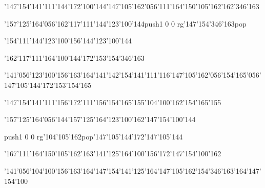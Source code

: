\null\vfill\ipa\centerline{\enskip\char'147\char'154\char'141\char'111\char'144\char'172\enskip\char'100\char'144\enskip\char'147\char'105\char'162\char'056\char'111\char'164\enskip\enskip\enskip\char'150\char'105\char'162\enskip\char'162\char'346\char'163}\medskip\centerline{\enskip\char'157\char'125\char'164\char'056\char'162\char'117\char'111\char'144\enskip\enskip\enskip\enskip\char'123\char'100\char'144\enskip\enskip\enskip\enskip\enskip\pdfcolorstack\match push{1 0 0 rg}\char'147\char'154\char'346\char'163\pdfcolorstack\match pop{}}\medskip\centerline{\enskip\char'154\char'111\char'144\enskip\enskip\enskip\enskip\char'123\char'100\char'156\char'144\enskip\enskip\enskip\char'123\char'100\char'144}\medskip\centerline{\enskip\enskip\enskip\enskip\enskip\enskip\enskip\enskip\enskip\enskip\enskip\enskip\char'162\char'117\char'111\char'164\enskip\char'100\char'144\char'172\enskip\char'153\char'154\char'346\char'163}\medskip\centerline{\enskip\char'141\char'056\char'123\char'100\char'156\char'163\char'164\enskip\char'141\enskip\char'142\char'154\char'141\char'111\char'116\enskip\char'147\char'105\char'162\char'056\char'154\char'165\char'056\char'147\char'105\char'144\char'172\enskip\char'153\char'154\char'165}\medskip\vfill\footline{\hfil\tt\folio\hfil}\eject
\null\vfill\ipa\centerline{\enskip\char'147\char'154\char'141\char'111\char'156\char'172\enskip\char'111\char'156\enskip\char'154\char'165\char'155\enskip\enskip\enskip\enskip\enskip\enskip\char'104\char'100\char'162\enskip\char'154\char'165\char'155}\medskip\centerline{\enskip\char'157\char'125\char'164\char'056\char'144\char'157\char'125\char'164\enskip\enskip\enskip\enskip\char'123\char'100\char'162\enskip\enskip\enskip\enskip\enskip\char'147\char'154\char'100\char'144}\medskip\centerline{\enskip\pdfcolorstack\match push{1 0 0 rg}\char'104\char'105\char'162\pdfcolorstack\match pop{}\enskip\enskip\enskip\enskip\char'147\char'105\char'144\char'172\enskip\enskip\enskip\char'147\char'105\char'144}\medskip\centerline{\enskip\enskip\enskip\enskip\char'167\char'111\char'164\enskip\char'150\char'105\char'162\enskip\char'163\char'141\char'125\char'164\enskip\char'100\char'156\char'172\enskip\char'147\char'154\char'100\char'162}\medskip\centerline{\enskip\char'141\char'056\char'104\char'100\char'156\char'163\char'164\enskip\enskip\enskip\char'147\char'154\char'141\char'125\char'164\enskip\char'147\char'105\char'162\enskip\enskip\enskip\char'154\char'346\char'163\char'164\enskip\char'147\char'154\char'100}\medskip\vfill\footline{\hfil\tt\folio\hfil}\eject
